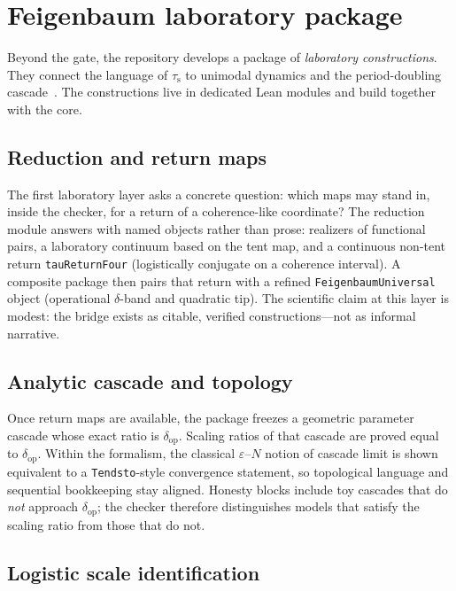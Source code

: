 \documentclass[11pt,a4paper]{article}
\newcommand{\taus}{\tau_{\mathrm{s}}}
\newcommand{\deltaop}{\delta_{\mathrm{op}}}
\begin{document}
\section{Feigenbaum laboratory package}

Beyond the gate, the repository develops a package of \emph{laboratory constructions}.
They connect the language of \(\taus\) to unimodal dynamics and the period-doubling
cascade~\cite{feigenbaum1978,deMellovanStrien,lyubich1999}.
The constructions live in dedicated Lean modules and build together with the core.

\subsection{Reduction and return maps}

The first laboratory layer asks a concrete question: which maps may stand in, inside the checker, for a return of a coherence-like coordinate?
The reduction module answers with named objects rather than prose: realizers of functional pairs, a laboratory continuum based on the tent map, and a continuous non-tent return \texttt{tauReturnFour} (logistically conjugate on a coherence interval).
A composite package then pairs that return with a refined \texttt{FeigenbaumUniversal} object (operational \(\delta\)-band and quadratic tip).
The scientific claim at this layer is modest: the bridge exists as citable, verified constructions---not as informal narrative.

\subsection{Analytic cascade and topology}

Once return maps are available, the package freezes a geometric parameter cascade whose exact ratio is \(\deltaop\).
Scaling ratios of that cascade are proved equal to \(\deltaop\).
Within the formalism, the classical \(\varepsilon\)--\(N\) notion of cascade limit is shown equivalent to a \texttt{Tendsto}-style convergence statement, so topological language and sequential bookkeeping stay aligned.
Honesty blocks include toy cascades that do \emph{not} approach \(\deltaop\); the checker therefore distinguishes models that satisfy the scaling ratio from those that do not.

\subsection{Logistic scale identification}
\end{document}
